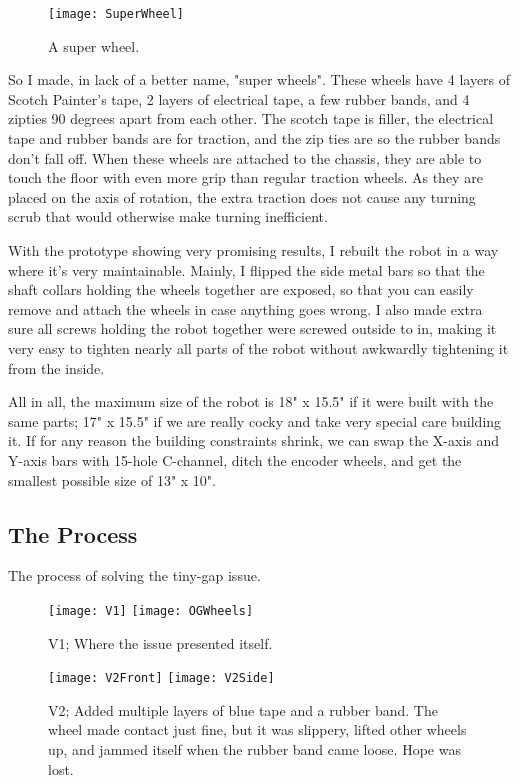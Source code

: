 \begin{figure}[h]
    \centering
    \texttt{[image: SuperWheel]}
    \caption{
        A super wheel.
    }
\end{figure}

So I made, in lack of a better name, "super wheels". These wheels have 4 layers of Scotch Painter's tape, 2 layers of electrical tape, a few rubber bands, and 4 zipties 90 degrees apart from each other. The scotch tape is filler, the electrical tape and rubber bands are for traction, and the zip ties are so the rubber bands don't fall off. When these wheels are attached to the chassis, they are able to touch the floor with even more grip than regular traction wheels. As they are placed on the axis of rotation, the extra traction does not cause any turning scrub \cite{TurningScrub} that would otherwise make turning inefficient.

With the prototype showing very promising results, I rebuilt the robot in a way where it's very maintainable. Mainly, I flipped the side metal bars so that the shaft collars holding the wheels together are exposed, so that you can easily remove and attach the wheels in case anything goes wrong. I also made extra sure all screws holding the robot together were screwed outside to in, making it very easy to tighten nearly all parts of the robot without awkwardly tightening it from the inside.

All in all, the maximum size of the robot is 18" x 15.5" if it were built with the same parts; 17" x 15.5" if we are really cocky and take very special care building it. If for any reason the building constraints shrink, we can swap the X-axis and Y-axis bars with 15-hole C-channel, ditch the encoder wheels, and get the smallest possible size of 13" x 10".

\subsection{The Process}
The process of solving the tiny-gap issue.

\begin{figure}[h]
    \centering
    \texttt{[image: V1]}
    \texttt{[image: OGWheels]}
    \caption{
        V1; Where the issue presented itself.
    }
\end{figure}

\begin{figure}[h]
    \centering
    \texttt{[image: V2Front]}
    \texttt{[image: V2Side]}
    \caption{
        V2; Added multiple layers of blue tape and a rubber band. The wheel made contact just fine, but it was slippery, lifted other wheels up, and jammed itself when the rubber band came loose. Hope was lost.
    }
\end{figure}

